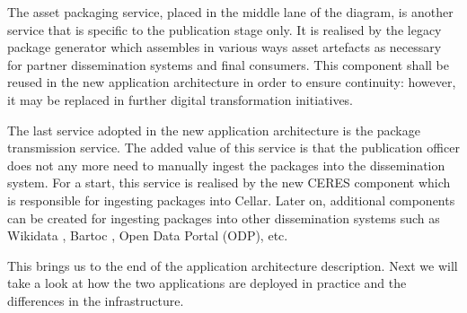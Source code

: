 	The asset packaging service, placed in the middle lane of the diagram, is another service that is specific to the publication stage only. It is realised by the legacy package generator which assembles in various ways asset artefacts as necessary for partner dissemination systems and final consumers. This component shall be reused in the new application architecture in order to ensure continuity: however, it may be replaced in further digital transformation initiatives. 
	
	The last service adopted in the new application architecture is the package transmission service. The added value of this service is that the publication officer does not any more need to manually ingest the packages into the dissemination system. For a start, this service is realised by the new CERES component which is responsible for ingesting packages into Cellar. Later on, additional components can be created for ingesting packages into other dissemination systems such as Wikidata \citep{vrandevcic2014wikidata}, Bartoc \citep{ledl2016describing}, Open Data Portal (ODP), etc. 
	
	This brings us to the end of the application architecture description. Next we will take a look at how the two applications are deployed in practice and the differences in the infrastructure.